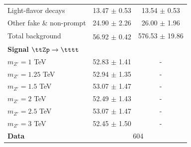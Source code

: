 \documentclass[../thesis.tex]{subfiles}
\begin{document}
\begin{table}[!htb]
{\begin{tabular}{lcc}
      Light-flavor decays 		& 13.47 $\pm$ 0.53		& 13.54 $\pm$ 0.53 \\
      Other fake \& non-prompt 	& 24.90 $\pm$ 2.26		& 26.00 $\pm$ 1.96 \\
      \midrule
      Total background		 	& 56.92 $\pm$ 0.42\textsuperscript{\textdagger}		& 576.53 $\pm$ 19.86 \\
      \midrule
      \multicolumn{3}{l}{\textbf{Signal $\ttZp \rightarrow \tttt$}} 	\\	
      $m_{Z'}=1$ TeV 			& 52.83 $\pm$ 1.41		& - \\
      $m_{Z'}=1.25$ TeV 		& 52.94 $\pm$ 1.35		& - \\
      $m_{Z'}=1.5$ TeV 			& 53.07 $\pm$ 1.47		& - \\
      $m_{Z'}=2$ TeV 			& 52.49 $\pm$ 1.43		& - \\ %
      $m_{Z'}=2.5$ TeV 			& 53.07 $\pm$ 1.47		& - \\
      $m_{Z'}=3$ TeV 			& 52.45 $\pm$ 1.50		& - \\
      \midrule
      \textbf{Data}				& \multicolumn{2}{c}{604} 		\\
      \midrule\bottomrule
    \end{tabular}
}
\end{table}
\end{document}

